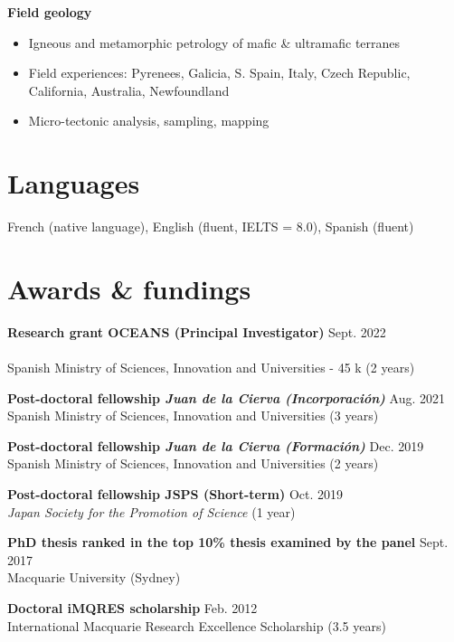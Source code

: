 \documentclass[a4paper,10pt]{article}
\begin{document}
    \textbf{Field geology}
    \begin{itemize}[itemsep=0pt,parsep=2pt]
        \item Igneous and metamorphic petrology of mafic \& ultramafic terranes
        \item Field experiences: Pyrenees, Galicia, S. Spain, Italy, Czech Republic, California, Australia, Newfoundland
        \item Micro-tectonic analysis, sampling, mapping
    \end{itemize}

\section{Languages}
    French (native language), English (fluent, IELTS = 8.0), Spanish (fluent)

\section{Awards \& fundings}

    \textbf{Research grant OCEANS (Principal Investigator)}
    \hfill {Sept. 2022}\\
    \\
    Spanish Ministry of Sciences, Innovation and Universities - 45 k\geneuronarrow{} (2 years)
    
    \textbf{Post-doctoral fellowship \textit{Juan de la Cierva (Incorporación)}}
    \hfill {Aug. 2021}\\
    Spanish Ministry of Sciences, Innovation and Universities (3 years)
    
    \textbf{Post-doctoral fellowship \textit{Juan de la Cierva (Formación)}}
    \hfill {Dec. 2019}\\
    Spanish Ministry of Sciences, Innovation and Universities (2 years)
    
    \textbf{Post-doctoral fellowship JSPS (Short-term)}
    \hfill {Oct. 2019}\\
    \textit{Japan Society for the Promotion of Science} (1 year)
    
    \textbf{PhD thesis ranked in the top 10\% thesis examined by the panel}
    \hfill {Sept. 2017}\\
    Macquarie University (Sydney)
    
    \textbf{Doctoral iMQRES scholarship}
    \hfill {Feb. 2012}\\
    International Macquarie Research Excellence Scholarship (3.5 years)
\end{document}
